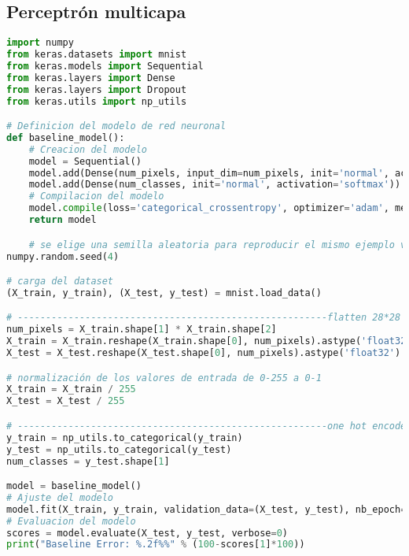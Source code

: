 \subsection{Perceptrón multicapa}
\begin{lstlisting}[language=Python]
import numpy
from keras.datasets import mnist
from keras.models import Sequential
from keras.layers import Dense
from keras.layers import Dropout
from keras.utils import np_utils

# Definicion del modelo de red neuronal
def baseline_model():
	# Creacion del modelo
	model = Sequential()
	model.add(Dense(num_pixels, input_dim=num_pixels, init='normal', activation='relu'))
	model.add(Dense(num_classes, init='normal', activation='softmax'))
	# Compilacion del modelo
	model.compile(loss='categorical_crossentropy', optimizer='adam', metrics=['accuracy'])
	return model

	# se elige una semilla aleatoria para reproducir el mismo ejemplo varias veces
numpy.random.seed(4)

# carga del dataset
(X_train, y_train), (X_test, y_test) = mnist.load_data()

# -------------------------------------------------------flatten 28*28 images to a 784 vector for each image
num_pixels = X_train.shape[1] * X_train.shape[2]
X_train = X_train.reshape(X_train.shape[0], num_pixels).astype('float32')
X_test = X_test.reshape(X_test.shape[0], num_pixels).astype('float32')

# normalización de los valores de entrada de 0-255 a 0-1
X_train = X_train / 255
X_test = X_test / 255

# -------------------------------------------------------one hot encode outputs
y_train = np_utils.to_categorical(y_train)
y_test = np_utils.to_categorical(y_test)
num_classes = y_test.shape[1]

model = baseline_model()
# Ajuste del modelo
model.fit(X_train, y_train, validation_data=(X_test, y_test), nb_epoch=10, batch_size=200, verbose=2)
# Evaluacion del modelo
scores = model.evaluate(X_test, y_test, verbose=0)
print("Baseline Error: %.2f%%" % (100-scores[1]*100))
\end{lstlisting}

